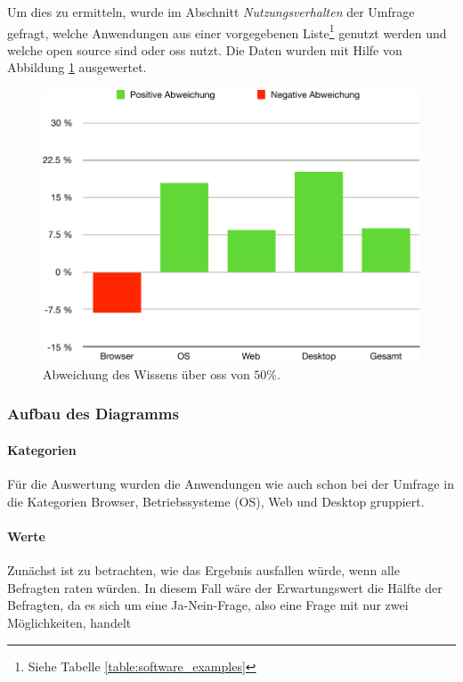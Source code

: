 \documentclass[a4paper]{article}
\begin{document}
            Um dies zu ermitteln, wurde im Abschnitt \emph{Nutzungsverhalten} der Umfrage gefragt, welche Anwendungen aus einer vorgegebenen Liste\footnote{Siehe Tabelle \ref{table:software_examples}} genutzt werden und welche open source sind oder \gls{oss} nutzt. Die Daten wurden mit Hilfe von Abbildung \ref{figure:knowledge_difference} ausgewertet.
            
                        
            \begin{figure}
                \includegraphics[width=\textwidth]{assets/results/openSourceJudging/openSourceJudgingDetailedOSSOnly2.pdf}
                \caption{Abweichung des Wissens über \gls{oss} von $50 \%$.}
                \label{figure:knowledge_difference}
            \end{figure}
            
            
            \subsubsection{Aufbau des Diagramms}
                \paragraph{Kategorien}
                    Für die Auswertung wurden die Anwendungen wie auch schon bei der Umfrage in die Kategorien Browser, Betriebssysteme (OS), Web und Desktop gruppiert.
                    
                \paragraph{Werte}
                    Zunächst ist zu betrachten, wie das Ergebnis ausfallen würde, wenn alle Befragten raten würden. In diesem Fall wäre der Erwartungswert die Hälfte der Befragten, da es sich um eine Ja-Nein-Frage, also eine Frage mit nur zwei Möglichkeiten, handelt
                    
\end{document}
